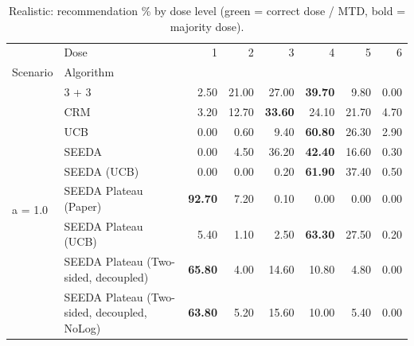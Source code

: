 \begin{table}[H]
\centering
\caption{Realistic: recommendation \% by dose level (green = correct dose / MTD, bold = majority dose).}
\label{tab:real_rec_by_dose}
\begin{tabular}{llrrrrrr}
\toprule
 & Dose & 1 & 2 & 3 & 4 & 5 & 6 \\
Scenario & Algorithm &  &  &  &  &  &  \\
\midrule
\multirow[c]{9}{*}{a = 1.0} & 3 + 3 & 2.50 & 21.00 & {\cellcolor[HTML]{C8E6C9}} 27.00 & \bfseries 39.70 & 9.80 & 0.00 \\
 & CRM & 3.20 & 12.70 & {\cellcolor[HTML]{C8E6C9}} \bfseries 33.60 & 24.10 & 21.70 & 4.70 \\
 & UCB & 0.00 & 0.60 & {\cellcolor[HTML]{C8E6C9}} 9.40 & \bfseries 60.80 & 26.30 & 2.90 \\
 & SEEDA & 0.00 & 4.50 & {\cellcolor[HTML]{C8E6C9}} 36.20 & \bfseries 42.40 & 16.60 & 0.30 \\
 & SEEDA (UCB) & 0.00 & 0.00 & {\cellcolor[HTML]{C8E6C9}} 0.20 & \bfseries 61.90 & 37.40 & 0.50 \\
 & SEEDA Plateau (Paper) & \bfseries 92.70 & 7.20 & {\cellcolor[HTML]{C8E6C9}} 0.10 & 0.00 & 0.00 & 0.00 \\
 & SEEDA Plateau (UCB) & 5.40 & 1.10 & {\cellcolor[HTML]{C8E6C9}} 2.50 & \bfseries 63.30 & 27.50 & 0.20 \\
 & SEEDA Plateau (Two-sided, decoupled) & \bfseries 65.80 & 4.00 & {\cellcolor[HTML]{C8E6C9}} 14.60 & 10.80 & 4.80 & 0.00 \\
 & SEEDA Plateau (Two-sided, decoupled, NoLog) & \bfseries 63.80 & 5.20 & {\cellcolor[HTML]{C8E6C9}} 15.60 & 10.00 & 5.40 & 0.00 \\
\bottomrule
\end{tabular}
\end{table}
